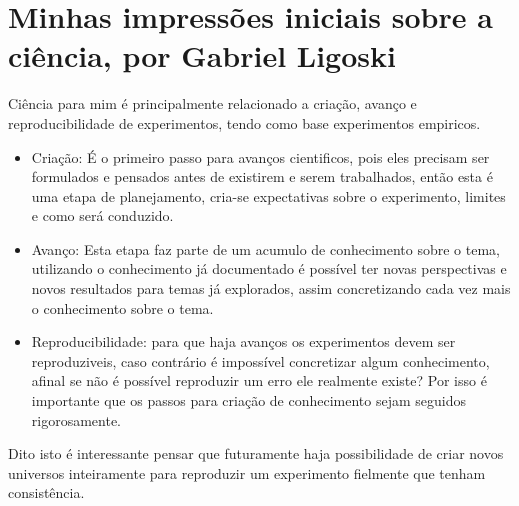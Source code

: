 \section{Minhas impressões iniciais sobre a ciência, por Gabriel Ligoski}

Ciência para mim é principalmente relacionado a criação, avanço e reproducibilidade de experimentos, tendo como base experimentos empiricos.
\begin{itemize}
  \item Criação: É o primeiro passo para avanços cientificos, pois eles precisam ser formulados e pensados antes de existirem e serem trabalhados, então esta é uma etapa de planejamento, cria-se expectativas sobre o experimento, limites e como será conduzido.
  \item Avanço: Esta etapa faz parte de um acumulo de conhecimento sobre o tema, utilizando o conhecimento já documentado é possível ter novas perspectivas e novos resultados para temas já explorados, assim concretizando cada vez mais o conhecimento sobre o tema.
  \item \gls{Reproducibilidade}: para que haja avanços os experimentos devem ser reproduziveis, caso contrário é impossível concretizar algum conhecimento, afinal se não é possível reproduzir um erro ele realmente existe? Por isso é importante que os passos para criação de conhecimento sejam seguidos rigorosamente.
\end{itemize}

Dito isto é interessante pensar que futuramente haja possibilidade de criar novos universos inteiramente para reproduzir um experimento fielmente que tenham consistência.
